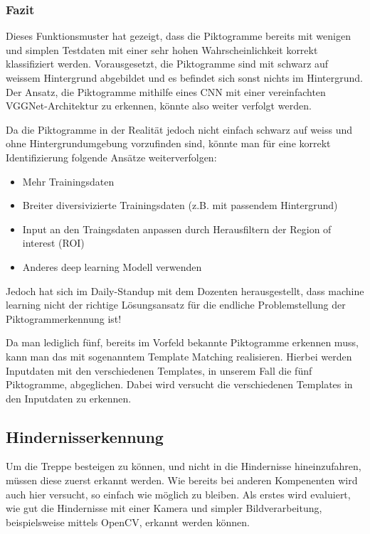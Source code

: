 \newpage

\subsubsection{Fazit}
Dieses Funktionsmuster hat gezeigt, dass die Piktogramme bereits mit wenigen und simplen Testdaten mit einer sehr hohen Wahrscheinlichkeit korrekt klassifiziert werden. Vorausgesetzt, die Piktogramme sind mit schwarz auf weissem Hintergrund abgebildet und es befindet sich sonst nichts im Hintergrund. Der Ansatz, die Piktogramme mithilfe eines CNN mit einer vereinfachten VGGNet-Architektur zu erkennen, könnte also weiter verfolgt werden.  

Da die Piktogramme in der Realität jedoch nicht einfach schwarz auf weiss und ohne Hintergrundumgebung vorzufinden sind, könnte man für eine korrekt Identifizierung folgende Ansätze weiterverfolgen:
\begin{itemize}
    \item Mehr Trainingsdaten
    \item Breiter diversivizierte Trainingsdaten (z.B. mit passendem Hintergrund)
    \item Input an den Traingsdaten anpassen durch Herausfiltern der Region of interest (ROI)
    \item Anderes deep learning Modell verwenden
 \end{itemize}
 
Jedoch hat sich im Daily-Standup mit dem Dozenten herausgestellt, dass machine learning nicht der richtige Lösungsansatz für die endliche Problemstellung der Piktogrammerkennung ist! 

Da man lediglich fünf, bereits im Vorfeld bekannte Piktogramme erkennen muss, kann man das mit sogenanntem Template Matching \cite{OpenCV-Template-Matching} realisieren. Hierbei werden Inputdaten mit den verschiedenen Templates, in unserem Fall die fünf Piktogramme, abgeglichen. Dabei wird versucht die verschiedenen Templates in den Inputdaten zu erkennen. 


\subsection{Hindernisserkennung}
\label{HindernisserkennungFunktinosmuster}

Um die Treppe besteigen zu können, und nicht in die Hindernisse hineinzufahren, müssen
diese zuerst erkannt werden. Wie bereits bei anderen Kompenenten wird auch hier versucht, so einfach wie möglich zu bleiben.
Als erstes wird evaluiert, wie gut die Hindernisse mit einer Kamera
und simpler Bildverarbeitung, beispielsweise mittels OpenCV\cite{OpenCV}, erkannt werden
können.

